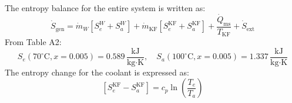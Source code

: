 The entropy balance for the entire system is written as:  
\[
\dot{S}_{\text{gen}} = \dot{m}_W \left[ S_e^W + S_a^W \right] + \dot{m}_{\text{KF}} \left[ S_e^{\text{KF}} + S_a^{\text{KF}} \right] + \frac{\dot{Q}_{\text{ms}}}{T_{\text{KF}}} + \dot{S}_{\text{ext}}
\]  
From Table A2:  
\[
S_e(70^\circ\text{C}, x = 0.005) = 0.589 \, \frac{\text{kJ}}{\text{kg·K}}, \quad S_a(100^\circ\text{C}, x = 0.005) = 1.337 \, \frac{\text{kJ}}{\text{kg·K}}
\]  
The entropy change for the coolant is expressed as:  
\[
\left[ S_e^{\text{KF}} - S_a^{\text{KF}} \right] = c_p \ln \left( \frac{T_e}{T_a} \right)
\]